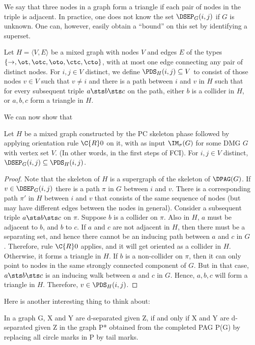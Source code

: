 We say that three nodes in a graph form a triangle if each pair of nodes in the triple is adjacent.
In practice, one does not know the set $\DSEP_G(i,j)$ if $G$ is unknown.
One can, however, easily obtain a ``bound'' on this set by identifying a superset.
\begin{Def}
  Let $H = \langle V,E\rangle$ be a mixed graph with nodes $V$ and edges $E$ of the types $\{\to,\ot,\otc,\oto,\ctc,\cto\}$, with at most one edge connecting any pair of distinct nodes.
  For $i, j \in V$ distinct, we define $\PDS_H(i,j) \subseteq V$ to consist of those nodes
  $v \in V$ such that $v \ne i$ and there is a path between $i$ and $v$ in $H$ such that for
  every subsequent triple $a \sts b \sts c$ on the path, either $b$ is a collider in $H$,
  or $a,b,c$ form a triangle in $H$.
\end{Def}
We can now show that
\begin{Prp}
  Let $H$ be a mixed graph constructed by the PC skeleton phase followed by applying orientation rule $\C{R}0$ on it, with as input $\IM_\sigma(G)$ for some DMG $G$ with vertex set $V$.
  (In other words, in the first steps of FCI).
  For $i, j \in V$ distinct, $\DSEP_G(i,j) \subseteq \PDS_H(i,j)$.
\end{Prp}
\begin{proof}
  Note that the skeleton of $H$ is a supergraph of the skeleton of $\DPAG(G)$.
  If $v \in \DSEP_G(i,j)$ there is a path $\pi$ in $G$ between $i$ and $v$.
  There is a corresponding path $\pi'$ in $H$ between $i$ and $v$ that consists of the same sequence of nodes (but may have different edges between the nodes in general).
  Consider a subsequent triple $a \sts b \sts c$ on $\pi$.
  Suppose $b$ is a collider on $\pi$.
  Also in $H$, $a$ must be adjacent to $b$, and $b$ to $c$.
  If $a$ and $c$ are not adjacent in $H$, then there must be a separating set, and hence there cannot be an inducing path between $a$ and $c$ in $G$.
  Therefore, rule $\C{R}0$ applies, and it will get oriented as a collider in $H$.
  Otherwise, it forms a triangle in $H$.
  If $b$ is a non-collider on $\pi$, then it can only point to nodes in the same strongly connected component of $G$.
  But in that case, $a \sts b \sts c$ is an inducing walk between $a$ and $c$ in $G$.
  Hence, $a,b,c$ will form a triangle in $H$.
  Therefore, $v \in \PDS_H(i,j)$.
\end{proof}

Here is another interesting thing to think about:
\begin{Lem}
In a graph G, X and Y are d-separated given Z, if and only if X and Y are d-separated given Z in the graph P* obtained from the completed PAG P(G) by replacing all circle marks in P by tail marks.
\end{Lem}
